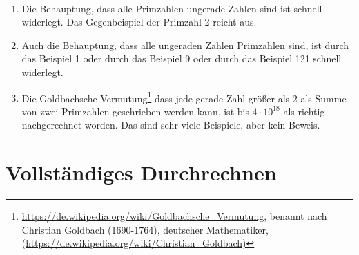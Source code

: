 \begin{Unit}[Beispiele] \ 

\begin{enumerate}
\item Die Behauptung, dass alle Primzahlen ungerade Zahlen sind ist schnell 
  widerlegt. Das Gegenbeispiel der Primzahl 2 reicht aus. 
\item Auch die Behauptung, dass alle ungeraden Zahlen Primzahlen sind, ist 
  durch das Beispiel 1 oder durch das Beispiel 9 oder durch das Beispiel 121 
  schnell widerlegt.
\item Die Goldbachsche Vermutung\footnote{ 
  \url{https://de.wikipedia.org/wiki/Goldbachsche_Vermutung}, benannt nach
  Christian Goldbach (1690-1764),
  deutscher Mathematiker,
  (\url{https://de.wikipedia.org/wiki/Christian_Goldbach)}} 
  dass jede gerade Zahl größer als 2 als Summe von zwei Primzahlen 
  geschrieben werden kann, ist bis $4 \cdot 10^{18}$ als richtig 
  nachgerechnet worden. Das sind sehr viele Beispiele, aber kein Beweis.
\end{enumerate}
\end{Unit}

\section{Vollständiges Durchrechnen}
\label{sec:Beweis - Durchrechnen}

